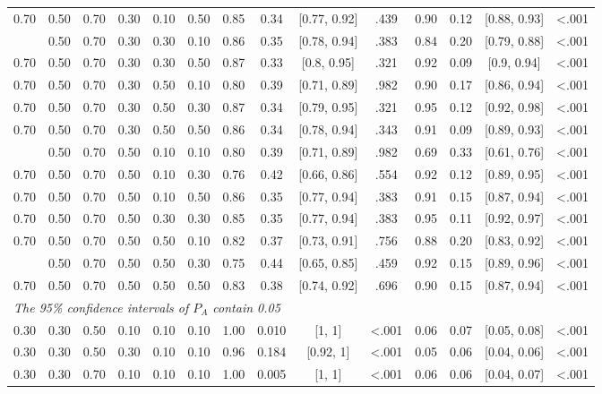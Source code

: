 \documentclass[
  11pt,
]{article}
\begin{document}
\begin{landscape}
\begin{ThreePartTable}
\begin{longtable}[t]{cccccccccccccc}
0.70 & 0.50 & 0.70 & 0.30 & 0.10 & 0.50 & 0.85 & 0.34 & {}[0.77, 0.92] & .439 & 0.90 & 0.12 & {}[0.88, 0.93] & <.001\\
\addlinespace
0.70 & 0.50 & 0.70 & 0.30 & 0.30 & 0.10 & 0.86 & 0.35 & {}[0.78, 0.94] & .383 & 0.84 & 0.20 & {}[0.79, 0.88] & <.001\\
0.70 & 0.50 & 0.70 & 0.30 & 0.30 & 0.50 & 0.87 & 0.33 & {}[0.8, 0.95] & .321 & 0.92 & 0.09 & {}[0.9, 0.94] & <.001\\
0.70 & 0.50 & 0.70 & 0.30 & 0.50 & 0.10 & 0.80 & 0.39 & {}[0.71, 0.89] & .982 & 0.90 & 0.17 & {}[0.86, 0.94] & <.001\\
0.70 & 0.50 & 0.70 & 0.30 & 0.50 & 0.30 & 0.87 & 0.34 & {}[0.79, 0.95] & .321 & 0.95 & 0.12 & {}[0.92, 0.98] & <.001\\
0.70 & 0.50 & 0.70 & 0.30 & 0.50 & 0.50 & 0.86 & 0.34 & {}[0.78, 0.94] & .343 & 0.91 & 0.09 & {}[0.89, 0.93] & <.001\\
\addlinespace
0.70 & 0.50 & 0.70 & 0.50 & 0.10 & 0.10 & 0.80 & 0.39 & {}[0.71, 0.89] & .982 & 0.69 & 0.33 & {}[0.61, 0.76] & <.001\\
0.70 & 0.50 & 0.70 & 0.50 & 0.10 & 0.30 & 0.76 & 0.42 & {}[0.66, 0.86] & .554 & 0.92 & 0.12 & {}[0.89, 0.95] & <.001\\
0.70 & 0.50 & 0.70 & 0.50 & 0.10 & 0.50 & 0.86 & 0.35 & {}[0.77, 0.94] & .383 & 0.91 & 0.15 & {}[0.87, 0.94] & <.001\\
0.70 & 0.50 & 0.70 & 0.50 & 0.30 & 0.30 & 0.85 & 0.35 & {}[0.77, 0.94] & .383 & 0.95 & 0.11 & {}[0.92, 0.97] & <.001\\
0.70 & 0.50 & 0.70 & 0.50 & 0.50 & 0.10 & 0.82 & 0.37 & {}[0.73, 0.91] & .756 & 0.88 & 0.20 & {}[0.83, 0.92] & <.001\\
\addlinespace
0.70 & 0.50 & 0.70 & 0.50 & 0.50 & 0.30 & 0.75 & 0.44 & {}[0.65, 0.85] & .459 & 0.92 & 0.15 & {}[0.89, 0.96] & <.001\\
0.70 & 0.50 & 0.70 & 0.50 & 0.50 & 0.50 & 0.83 & 0.38 & {}[0.74, 0.92] & .696 & 0.90 & 0.15 & {}[0.87, 0.94] & <.001\\
\multicolumn{14}{l}{\textit{The 95\% confidence intervals of $P_A$ contain 0.05}} \\
0.30 & 0.30 & 0.50 & 0.10 & 0.10 & 0.10 & 1.00 & 0.010 & {}[1, 1] & <.001 & 0.06 & 0.07 & {}[0.05, 0.08] & <.001\\
0.30 & 0.30 & 0.50 & 0.30 & 0.10 & 0.10 & 0.96 & 0.184 & {}[0.92, 1] & <.001 & 0.05 & 0.06 & {}[0.04, 0.06] & <.001\\
0.30 & 0.30 & 0.70 & 0.10 & 0.10 & 0.10 & 1.00 & 0.005 & {}[1, 1] & <.001 & 0.06 & 0.06 & {}[0.04, 0.07] & <.001\\

\end{longtable}
\end{ThreePartTable}
\end{landscape}
\end{document}

